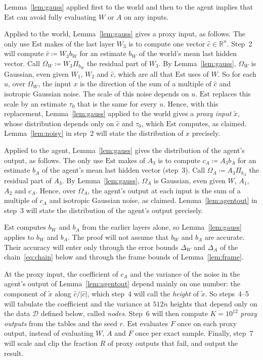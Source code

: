 \documentclass[10pt]{article}
\newcommand{\RR}{\mathbb{R}}
\newcommand{\Dd}{\mathcal{D}}\newcommand{\Ee}{\mathcal{E}}
\newcommand{\Est}{\mathrm{Est}}
\newcommand{\chat}{\hat c}
\begin{document}
Lemma~\ref{lem:gauss} applied first to the world and then to the agent
implies that $\Est$ can avoid fully evaluating $W$ or $A$ on any inputs.

Applied to the world, Lemma~\ref{lem:gauss} gives a proxy input, as follows. The only use $\Est$ makes
of the last layer $W_3$ is to compute one vector $\chat\in\RR^n$. Step~2 will
compute $\chat\coloneqq W_3b_W$ for an estimate $b_W$ of the world's mean
last hidden vector. Call $\Omega_W\coloneqq W_3\Pi_{b_W}$ the residual part of
$W_3$. By Lemma~\ref{lem:gauss}, $\Omega_W$ is
Gaussian, even given $W_1$, $W_2$ and $\chat$, which are all that $\Est$ uses of
$W$. So for each $u$, over
$\Omega_W$, the input $x$ is the direction of the sum of a multiple of
$\chat$ and isotropic Gaussian noise. The scale of this noise depends on
$u$. $\Est$ replaces this scale by an estimate $\tau_0$ that is the same for every
$u$. Hence, with this replacement,
Lemma~\ref{lem:gauss} applied to the world gives a \emph{proxy input} $\tilde x$, whose
distribution depends only on $\chat$ and $\tau_0$, which $\Est$ computes, as claimed.
Lemma~\ref{lem:noisy} in step~2 will state the distribution of $x$ precisely.

Applied to the agent, Lemma~\ref{lem:gauss} gives the distribution of the agent's output,
as follows.
The only use $\Est$ makes of $A_3$ is to compute $c_A\coloneqq A_3b_A$ for an
estimate $b_A$ of the agent's mean last hidden vector (step~3). Call $\Omega_A\coloneqq A_3\Pi_{b_A}$ the residual part of $A_3$.
By Lemma~\ref{lem:gauss}, $\Omega_A$ is Gaussian, even given $W$, $A_1$, $A_2$ and
$c_A$. Hence, over $\Omega_A$, the agent's output at each input is the sum
of a multiple of $c_A$ and isotropic Gaussian noise, as claimed.
Lemma~\ref{lem:agentout} in step~3 will state the distribution of the agent's output precisely.

$\Est$ computes $b_W$ and $b_A$ from the earlier layers alone, so Lemma~\ref{lem:gauss}
applies to $b_W$ and $b_A$. The proof will not assume that $b_W$ and $b_A$ are accurate.
Their accuracy will enter only
through the error bounds $\Delta_W$ and $\Delta_A$ of the chain~\eqref{eq:chain} below and through the frame bounds of Lemma~\ref{lem:frame}.

At the proxy input, the coefficient of $c_A$ and the variance of the noise
in the agent's output of Lemma~\ref{lem:agentout} depend mainly on one number: the component of $\tilde x$
along $\chat/|\chat|$, which step~4 will call the \emph{height} of $\tilde x$. So
steps~4--5 will tabulate the coefficient and the variance at $512n$ heights
that depend only on the data $\Dd$ defined below, called \emph{nodes}. Step~6 will then compute $K=10^{12}$
\emph{proxy outputs} from the tables and the seed $r$. $\Est$
evaluates $F$ once on each proxy output, instead of evaluating $W$, $A$ and
$F$ once per exact sample. Finally, step~7 will scale and clip the fraction $R$
of proxy outputs that fail, and output the result.
\end{document}
